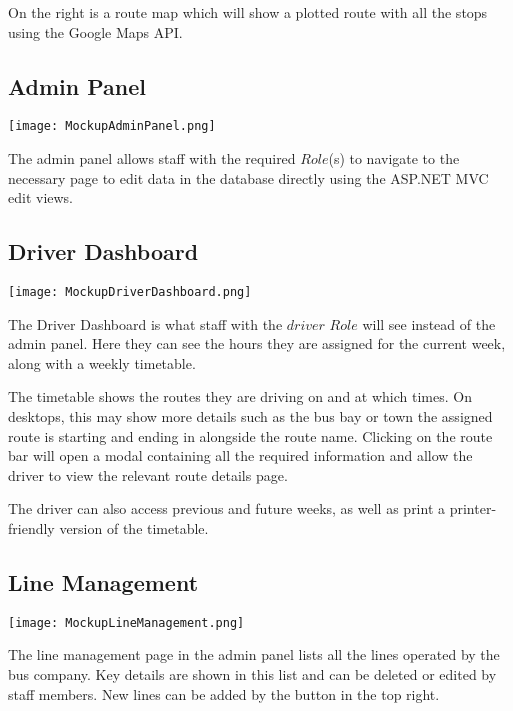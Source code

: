 \medskip

On the right is a route map which will show a plotted route with
all the stops using the Google Maps API.

\subsection{Admin Panel}

\texttt{[image: MockupAdminPanel.png]}

\medskip

The admin panel allows staff with the required $Role$(s) to navigate
to the necessary page to edit data in the database directly using
the ASP.NET MVC edit views.

\subsection{Driver Dashboard}

\texttt{[image: MockupDriverDashboard.png]}

\medskip

The Driver Dashboard is what staff with the $driver$ $Role$ will see
instead of the admin panel. Here they can see the hours they are
assigned for the current week, along with a weekly timetable.

\medskip

The timetable shows the routes they are driving on and at which
times. On desktops, this may show more details such as the bus bay
or town the assigned route is starting and ending in alongside the
route name. Clicking on the route bar will open a modal containing
all the required information and allow the driver to view the
relevant route details page.

\medskip

The driver can also access previous and future weeks, as well as
print a printer-friendly version of the timetable.

\subsection{Line Management}

\texttt{[image: MockupLineManagement.png]}

\medskip

The line management page in the admin panel lists all the lines
operated by the bus company. Key details are shown in this list and
can be deleted or edited by staff members. New lines can be added
by the button in the top right.

